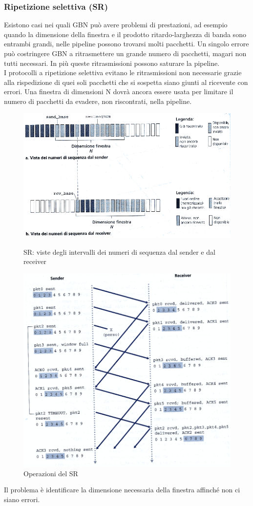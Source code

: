 \documentclass[11pt,a4paper]{article}
\begin{document}
\subsubsection{Ripetizione selettiva (SR)}
Esistono casi nei quali GBN può avere problemi di prestazioni, ad esempio quando la dimensione della finestra e il prodotto ritardo-larghezza di banda sono entrambi grandi, nelle pipeline possono trovarsi molti pacchetti. Un singolo errore può costringere GBN a ritrasmettere un grande numero di pacchetti, magari non tutti necessari. In più queste ritrasmissioni possono saturare la pipeline. \\
I protocolli a ripetizione selettiva evitano le ritrasmissioni non necessarie grazie alla rispedizione di quei soli pacchetti che si sospetta siano giunti al ricevente con errori. Una finestra di dimensioni N dovrà ancora essere usata per limitare il numero di pacchetti da evadere, non riscontrati, nella pipeline.
\begin{figure}
	\includegraphics[scale=0.6]{img/028.png}
	\caption{SR: viste degli intervalli dei numeri di sequenza dal sender e dal receiver}
	\includegraphics[scale=0.6]{img/029.png}
	\caption{Operazioni del SR}
\end{figure}
Il problema è identificare la dimensione necessaria della finestra affinché non ci siano errori.
\pagebreak
\end{document}
